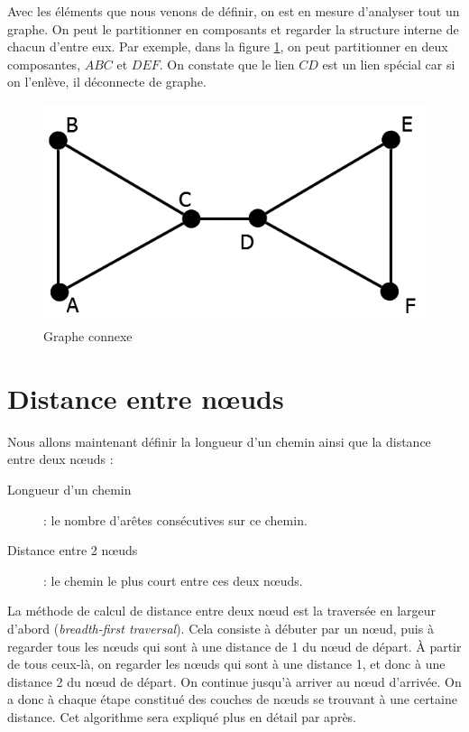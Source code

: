 Avec les éléments que nous venons de définir, on est en mesure d'analyser tout un graphe. On peut le partitionner en composants et regarder la structure interne de chacun d'entre eux. Par exemple, dans la figure \ref{gr_connexe}, on peut partitionner en deux composantes, $ABC$ et $DEF$. On constate que le lien $CD$ est un lien spécial car si on l'enlève, il déconnecte de graphe.\\
	\begin{figure}
	\center
	\includegraphics[scale=0.3]{images/18_gr_connexe.png}
	\caption{\label{gr_connexe} Graphe connexe}
	\end{figure}

\section{Distance entre n\oe uds}
Nous allons maintenant définir la longueur d'un chemin ainsi que la distance entre deux n\oe uds :
\begin{description}
\item[Longueur d'un chemin] : le nombre d'arêtes consécutives sur ce chemin.
\item [Distance entre 2 n\oe uds] : le chemin le plus court entre ces deux n\oe uds.
\end{description}

La méthode de calcul de distance entre deux n\oe ud est la traversée en largeur d'abord (\emph{breadth-first traversal}). Cela consiste à débuter par un n\oe ud, puis à regarder tous les n\oe uds qui sont à une distance de 1 du n\oe ud de départ. À partir de tous ceux-là, on regarder les n\oe uds qui sont à une distance 1, et donc à une distance 2 du n\oe ud de départ. On continue jusqu'à arriver au n\oe ud d'arrivée. On a donc à chaque étape constitué des couches de n\oe uds se trouvant à une certaine distance. Cet algorithme sera expliqué plus en détail par après.\\

